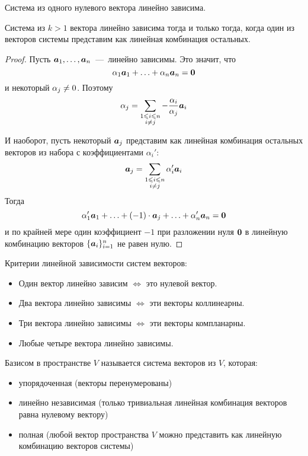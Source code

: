 \documentclass[a4paper,12pt]{article}
\begin{document}
  \begin{example}
    Система из одного нулевого вектора линейно зависима.
  \end{example}
  
  \begin{theorem}
    Система из $k > 1$ вектора линейно зависима тогда и только тогда, когда один из векторов системы представим как линейная комбинация остальных.
  \end{theorem}
  
  \begin{proof}
    Пусть $\boldsymbol a_1, \ldots, \boldsymbol a_n$~---~линейно зависимы.
    Это значит, что
    \[
      \alpha_1 \boldsymbol a_1 + \ldots + \alpha_n \boldsymbol a_n = \boldsymbol 0
    \]
    и некоторый $\alpha_j \hm{\not=} 0$.
    Поэтому
    \[
      \alpha_j = \sum\limits_{\substack{1 \leqslant i \leqslant n\\i \not= j}} -\frac{\alpha_i}{\alpha_j} \boldsymbol a_i
    \]
    
    И наоборот, пусть некоторый $\boldsymbol a_j$ представим как линейная комбинация остальных векторов из набора с коэффициентами $\alpha_i'$:
    \[
      \boldsymbol a_j = \sum\limits_{\substack{1 \leqslant i \leqslant n\\i \not= j}} \alpha_i' \boldsymbol a_i
    \]
    Тогда
    \[
      \alpha_1' \boldsymbol a_1 + \ldots + (-1) \cdot \boldsymbol a_j + \ldots + \alpha_n' \boldsymbol a_n = \boldsymbol 0
    \]
    и по крайней мере один коэффициент $-1$ при разложении нуля $\boldsymbol 0$ в линейную комбинацию векторов $\{\boldsymbol a_i\}_{i=1}^n$ не равен нулю.
  \end{proof}
  
  \begin{theorem}\label{theo:linear-dependence-criteria}
    Критерии линейной зависимости систем векторов:
    \begin{itemize}
      \item Один вектор линейно зависим $\Leftrightarrow$ это нулевой вектор.
      \item Два вектора линейно зависимы $\Leftrightarrow$ эти векторы коллинеарны.
      \item Три вектора линейно зависимы $\Leftrightarrow$ эти векторы компланарны.
      \item Любые четыре вектора линейно зависимы.
    \end{itemize}
  \end{theorem}
  
  \begin{definition}[Базис]
    Базисом в пространстве $V$ называется система векторов из $V$, которая:
    \begin{itemize}
      \item упорядоченная (векторы перенумерованы)
      \item линейно независимая (только тривиальная линейная комбинация векторов равна нулевому вектору)
      \item полная (любой вектор пространства $V$ можно представить как линейную комбинацию векторов системы)
    \end{itemize}
  \end{definition}
  
\end{document}
